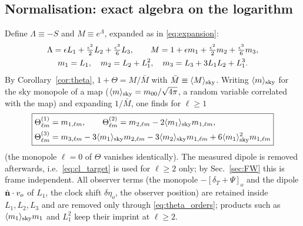 \subsection{Normalisation: exact algebra on the logarithm}
\label{sec:normalisation}
Define $\Lambda\equiv-S$ and $M\equiv e^{\Lambda}$, expanded as in \eqref{eq:expansion}:
\begin{gather}
\Lambda=\epsilon L_1+\tfrac{\epsilon^2}2L_2+\tfrac{\epsilon^3}6L_3,\qquad
M=1+\epsilon m_1+\tfrac{\epsilon^2}2m_2+\tfrac{\epsilon^3}6m_3,\nonumber\\
m_1=L_1,\quad m_2=L_2+L_1^2,\quad m_3=L_3+3L_1L_2+L_1^3 .
\label{eq:mdef}
\end{gather}
By Corollary~\ref{cor:theta}, $1+\Theta=M/\bar M$ with $\bar M\equiv\langle M\rangle_{\rm sky}$.  Writing $\langle m\rangle_{\rm sky}$ for the sky
monopole of a map ($\langle m\rangle_{\rm sky}=m_{00}/\sqrt{4\pi}$, a random variable correlated with the map) and expanding
$1/\bar M$, one finds for $\ell\ge1$
\begin{equation}
\boxed{\begin{aligned}&\Theta^{(1)}_{\ell m}=m_{1,\ell m},\qquad
\Theta^{(2)}_{\ell m}=m_{2,\ell m}-2\langle m_1\rangle_{\rm sky}m_{1,\ell m},\\
&\Theta^{(3)}_{\ell m}=m_{3,\ell m}-3\langle m_1\rangle_{\rm sky}m_{2,\ell m}-3\langle m_2\rangle_{\rm sky}m_{1,\ell m}+6\langle m_1\rangle_{\rm sky}^2m_{1,\ell m}\end{aligned}}
\label{eq:theta_orders}
\end{equation}
(the monopole $\ell=0$ of $\Theta$ vanishes identically).  The measured dipole is removed afterwards, i.e.\
\eqref{eq:cl_target} is used for $\ell\ge2$ only; by Sec.~\ref{sec:FW} this is frame independent.
All observer terms (the monopole $-[\delta_T+\Psi]_o$ and the dipole $\hat{\mathbf n}\cdot v_o$ of $L_1$, the clock shift
$\delta\eta_o$, the observer position) are retained inside $L_1,L_2,L_3$ and are removed only through
\eqref{eq:theta_orders}; products such as $\langle m_1\rangle_{\rm sky}m_1$ and $L_1^2$ keep their imprint at $\ell\ge2$.
